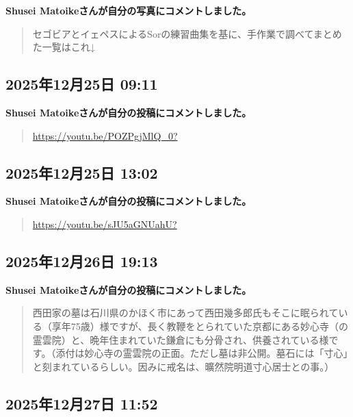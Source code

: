 \textbf{Shusei Matoikeさんが自分の写真にコメントしました。}

\begin{quote}
セゴビアとイェペスによるSorの練習曲集を基に、手作業で調べてまとめた一覧はこれ↓
\end{quote}

\subsection*{2025年12月25日 09:11}

\textbf{Shusei Matoikeさんが自分の投稿にコメントしました。}

\begin{quote}
\url{https://youtu.be/POZPgjMlQ_0?}
\end{quote}

\subsection*{2025年12月25日 13:02}

\textbf{Shusei Matoikeさんが自分の投稿にコメントしました。}

\begin{quote}
\url{https://youtu.be/sJU5aGNUahU?}
\end{quote}

\subsection*{2025年12月26日 19:13}

\textbf{Shusei Matoikeさんが自分の投稿にコメントしました。}

\begin{quote}
西田家の墓は石川県のかほく市にあって西田幾多郎氏もそこに眠られている（享年75歳）様ですが、長く教鞭をとられていた京都にある妙心寺（の霊雲院）と、晩年住まれていた鎌倉にも分骨され、供養されている様です。（添付は妙心寺の霊雲院の正面。ただし墓は非公開。墓石には「寸心」と刻まれているらしい。因みに戒名は、曠然院明道寸心居士との事。）
\end{quote}

\subsection*{2025年12月27日 11:52}

